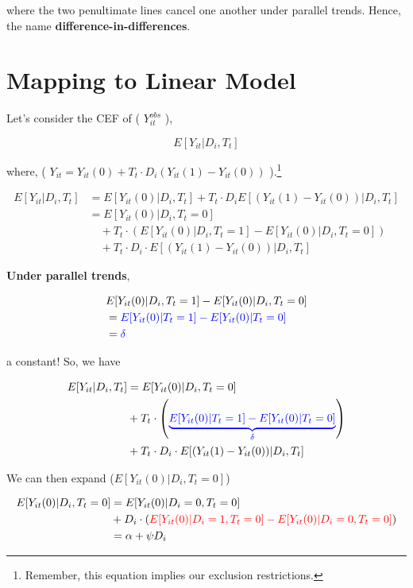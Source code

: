 \documentclass[
  letterpaper,
  DIV=11,
  numbers=noendperiod]{scrreprt}
\theoremstyle{definition}
\theoremstyle{remark}
\begin{document}
\begin{enumerate}
  where the two penultimate lines cancel one another under parallel
  trends. Hence, the name \textbf{difference-in-differences}.

  \section{Mapping to Linear Model}\label{mapping-to-linear-model}

  Let's consider the CEF of ( \(Y_{it}^{obs}\) ),

  \[
  E[Y_{it}|D_i,T_t]
  \]

  where, ( \(Y_{it} = Y_{it}(0) + T_t \cdot D_i(Y_{it}(1) - Y_{it}(0))\)
  ).\footnote{Remember, this equation implies our exclusion
    restrictions.}

  \[
  \begin{aligned}
  E[Y_{it}|D_i,T_t] &= E[Y_{it}(0)|D_i,T_t] + T_t \cdot D_i E[(Y_{it}(1) - Y_{it}(0))|D_i,T_t] \\
  &= E[Y_{it}(0)|D_i,T_t=0] \\
  &\quad + T_t \cdot \left( E[Y_{it}(0)|D_i,T_t=1] - E[Y_{it}(0)|D_i,T_t=0] \right) \\
  &\quad + T_t \cdot D_i \cdot E[(Y_{it}(1) - Y_{it}(0))|D_i,T_t]
  \end{aligned}
  \]

  \textbf{Under parallel trends},

  \[
  \begin{aligned}
  &E[Y_{it}(0)|D_i,T_t=1]-E[Y_{it}(0)|D_i,T_t=0] \\
  &= \textcolor{blue}{E[Y_{it}(0)|T_t=1]-E[Y_{it}(0)|T_t=0]} \\
  &= \textcolor{blue}{\delta}
  \end{aligned}
  \]

  a constant! So, we have

  \[
  \begin{aligned}
  E[Y_{it}|D_i,T_t] &= E[Y_{it}(0)|D_i,T_t=0] \\
  &+ T_t \cdot \left( \textcolor{blue}{\underbrace{E[Y_{it}(0)|T_t=1]-E[Y_{it}(0)|T_t=0]}_{\delta}} \right) \\
  &+ T_t \cdot D_i \cdot E[(Y_{it}(1)-Y_{it}(0))|D_i,T_t]
  \end{aligned}
  \]

  We can then expand (\(E[Y_{it}(0)|D_i, T_t=0]\))

  \[
  \begin{aligned}
  E[Y_{it}(0)|D_i,T_t=0] &= E[Y_{it}(0)|D_i=0,T_t=0] \\
  &+ D_i \cdot \left( \textcolor{red}{E[Y_{it}(0)|D_i=1,T_t=0] - E[Y_{it}(0)|D_i=0,T_t=0]} \right) \\
  &= \alpha + \psi D_i
  \end{aligned}
  \]


\end{enumerate}
\end{document}
